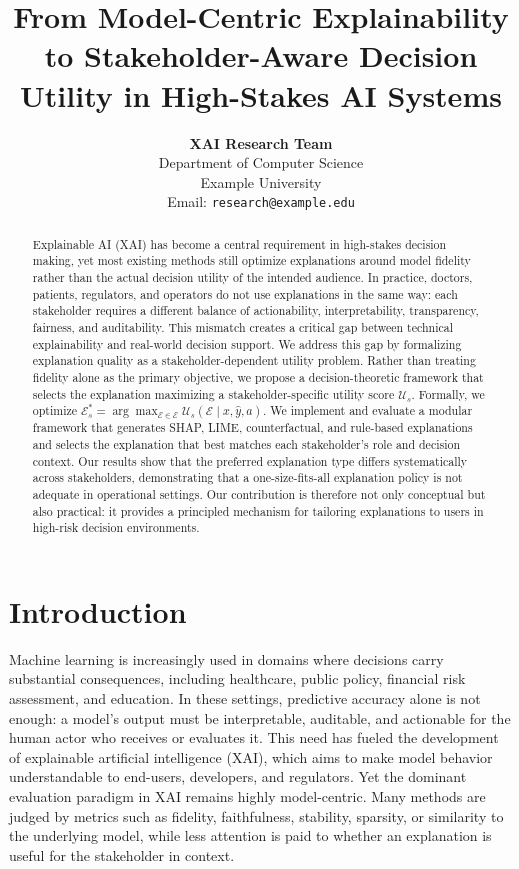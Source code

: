 \documentclass{article}
\title{From Model-Centric Explainability to Stakeholder-Aware Decision Utility in High-Stakes AI Systems}
\date{}
\author{
\textbf{XAI Research Team}\\
Department of Computer Science\\
Example University\\
Email: \texttt{research@example.edu}
}
\begin{document}
\maketitle

\begin{abstract}
Explainable AI (XAI) has become a central requirement in high-stakes decision making, yet most existing methods still optimize explanations around model fidelity rather than the actual decision utility of the intended audience. In practice, doctors, patients, regulators, and operators do not use explanations in the same way: each stakeholder requires a different balance of actionability, interpretability, transparency, fairness, and auditability. This mismatch creates a critical gap between technical explainability and real-world decision support. We address this gap by formalizing explanation quality as a stakeholder-dependent utility problem. Rather than treating fidelity alone as the primary objective, we propose a decision-theoretic framework that selects the explanation maximizing a stakeholder-specific utility score $\mathcal{U}_s$. Formally, we optimize $\mathcal{E}^*_s = \arg\max_{\mathcal{E} \in \mathcal{E}} \mathcal{U}_s(\mathcal{E} \mid x, \hat{y}, a)$. We implement and evaluate a modular framework that generates SHAP, LIME, counterfactual, and rule-based explanations and selects the explanation that best matches each stakeholder's role and decision context. Our results show that the preferred explanation type differs systematically across stakeholders, demonstrating that a one-size-fits-all explanation policy is not adequate in operational settings. Our contribution is therefore not only conceptual but also practical: it provides a principled mechanism for tailoring explanations to users in high-risk decision environments.
\end{abstract}

\section{Introduction}

Machine learning is increasingly used in domains where decisions carry substantial consequences, including healthcare, public policy, financial risk assessment, and education. In these settings, predictive accuracy alone is not enough: a model's output must be interpretable, auditable, and actionable for the human actor who receives or evaluates it. This need has fueled the development of explainable artificial intelligence (XAI), which aims to make model behavior understandable to end-users, developers, and regulators. Yet the dominant evaluation paradigm in XAI remains highly model-centric. Many methods are judged by metrics such as fidelity, faithfulness, stability, sparsity, or similarity to the underlying model, while less attention is paid to whether an explanation is useful for the stakeholder in context.
\end{document}
